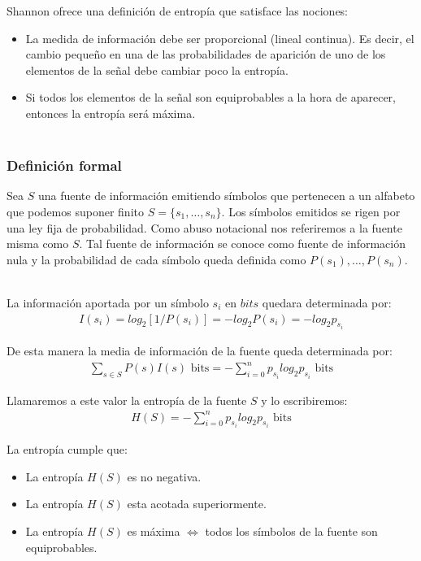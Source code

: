 Shannon ofrece una definici\'on de entrop\'ia que satisface las nociones:
\begin{itemize}
\item La medida de información debe ser proporcional (lineal continua). Es decir, el cambio pequeño en una de las probabilidades de aparición de uno de los elementos de la señal debe cambiar poco la entropía.

\item Si todos los elementos de la señal son equiprobables a la hora de aparecer, entonces la entropía será máxima. \\\
\end{itemize}

\subsubsection{Definici\'on formal}
Sea $S$ una fuente de informaci\'on emitiendo s\'imbolos que pertenecen a un alfabeto que podemos suponer finito $S = \{s_{1}, \ldots, s_{n}\}$. Los s\'imbolos emitidos se rigen por una ley fija de probabilidad. Como abuso notacional nos referiremos a la fuente misma como $S$. Tal fuente de informaci\'on se conoce como fuente de informaci\'on nula y la probabilidad de cada s\'imbolo queda definida como $P(s_{1}), \ldots, P(s_{n})$. \\\

La informaci\'on aportada por un s\'imbolo $s_{i}$ en $bits$ quedara determinada por:
\begin{gather*}
I(s_{i}) = log_{2}[1 / P(s_{i})] = - log_{2}P(s_{i}) = - log_{2}p_{s_{i}}
\end{gather*}
\vspace{1cm}

De esta manera la media de informaci\'on de la fuente queda determinada por:
\begin{gather*}
\sum_{s \in S}^{} P(s)I(s) \text{ bits} = - \sum_{i = 0}^{n} p_{s_{i}}log_{2}p_{s_{i}}  \text{ bits}
\end{gather*}
\vspace{1cm}

Llamaremos a este valor la entrop\'ia de la fuente $S$ y lo escribiremos:
\begin{gather*}
H(S) = - \sum_{i = 0}^{n} p_{s_{i}}log_{2}p_{s_{i}}  \text{ bits}
\end{gather*}
\vspace{1cm}

La entrop\'ia cumple que:
\begin{itemize}
\item La entropía $H(S)$ es no negativa.
\item La entrop\'ia $H(S)$ esta acotada superiormente.
\item La entrop\'ia $H(S)$ es m\'axima $\iff$ todos los s\'imbolos de la fuente son equiprobables. 
\end{itemize}
\vspace{1cm}

